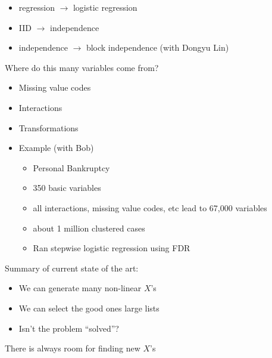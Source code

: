 \documentclass{beamer}
\begin{document}
\begin{frame}
\begin{overprint}
\begin{itemize}
\begin{itemize}
\end{itemize}
\item regression $\to$ logistic regression
\item IID $\to$ independence
\item independence $\to$ block independence (with Dongyu Lin)
\end{itemize}



Where do this many variables come from?
\begin{itemize}
\item Missing value codes
\item Interactions
\item Transformations
\item Example (with Bob)
\begin{itemize}
\item Personal Bankruptcy
\item 350 basic variables
\item all interactions, missing value codes, etc lead to 67,000 variables
\item about 1 million clustered cases
\item Ran stepwise logistic regression using FDR
\end{itemize}
\end{itemize}


Summary of current state of the art:
\begin{itemize}
\item We can generate many non-linear $X$'s
\item We can select the good ones large lists
\item Isn't the problem ``solved''?
\end{itemize}

There is always room for finding new $X$'s


\end{overprint}
\end{frame}


\end{document}
